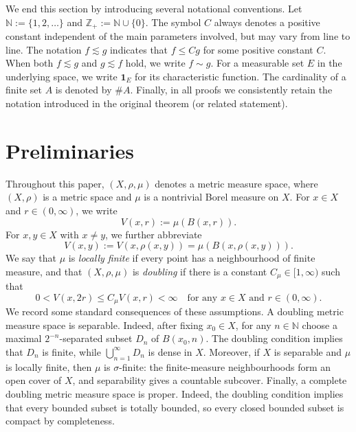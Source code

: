 \documentclass[11pt]{amsart}
\theoremstyle{definition}
\theoremstyle{remark}
\numberwithin{equation}{section}
\begin{document}
We end this section by introducing several notational conventions.  Let
$\mathbb N:=\{1,2,\ldots\}$ and $\mathbb Z_+:=\mathbb N\cup\{0\}$.
The symbol $C$ always denotes a
positive constant independent of the main parameters involved, but may vary
from line to line.   The notation $f\lesssim g$ indicates that $f\leq Cg$
for some positive constant
$C$.  When both $f\lesssim g$ and $g\lesssim f$ hold, we write $f\sim g$.
For a measurable set $E$ in the
underlying space, we write $\mathbf{1}_E$ for its characteristic function. The cardinality
of a
finite set $A$ is denoted by $\#A$.
Finally, in all proofs we
consistently retain the notation introduced in the original theorem (or
related statement).

\section{Preliminaries}\label{sec:preliminaries}

Throughout this paper, $(X,\rho,\mu)$ denotes a metric measure space, where
$(X,\rho)$ is a metric space and $\mu$ is a nontrivial Borel measure on $X$.
For $x\in X$ and $r\in(0,\infty)$, we write
\begin{equation*}
  V(x,r):=\mu(B(x,r)).
\end{equation*}
For $x,y\in X$ with $x\neq y$, we further abbreviate
\begin{equation*}
  V(x,y):=V(x,\rho(x,y))=\mu(B(x,\rho(x,y))).
\end{equation*}
We say that $\mu$ is \emph{locally finite} if every point has a neighbourhood of
finite measure, and that $(X,\rho,\mu)$ is \emph{doubling} if there is a constant
$C_\mu\in[1,\infty)$ such that
\begin{equation*}
  0<V(x,2r)\leq C_\mu V(x,r)<\infty
  \quad\text{for any }x\in X\text{ and }r\in(0,\infty).
\end{equation*}
We record some standard consequences of these assumptions. A doubling metric
measure space is separable. Indeed, after fixing $x_0\in X$, for any
$n\in\mathbb N$ choose a maximal $2^{-n}$-separated subset $D_n$ of
$B(x_0,n)$. The doubling condition implies that $D_n$ is finite, while
$\bigcup_{n=1}^\infty D_n$ is dense in $X$. Moreover, if $X$ is separable and
$\mu$ is locally finite, then $\mu$ is $\sigma$-finite: the finite-measure
neighbourhoods form an open cover of $X$, and separability gives a countable
subcover. Finally, a complete doubling metric measure space is proper. Indeed,
the doubling condition implies that every bounded subset is totally
bounded, so every closed bounded subset is compact by completeness.
\end{document}
